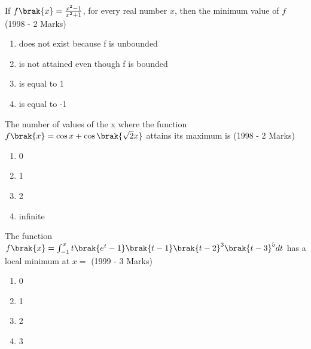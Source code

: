 \iffalse
  \title{Assignment}
  \author{Siddhanth Yellanki}
  \section{mcq-multiple}
\fi
    \item{
            If $f\brak{x} =  \frac{x^2-1}{x^2+1}$, for every real number $x$, then the minimum value of $f$  \\ \text{  }\hfill
                {(1998 - 2 Marks)}
            \begin{enumerate}
                \item does not exist because f is unbounded
                \item is not attained even though f is bounded
                \item is equal to 1
                \item is equal to -1
            \end{enumerate} 
            }
    \item{
            The number of values of the x where the function $f\brak{x}=\cos x + \cos\brak{\sqrt{2}x}$ attains its maximum is  \hfill
                {(1998 - 2 Marks)}
            \begin{multicols}{2}
                \begin{enumerate}
                    \item 0
                    \item 1
                    \item 2
                    \item infinite
                \end{enumerate}
            \end{multicols}
        }
    \item{
     
            The function $f\brak{x}= \int_{-1}^x t\brak{e^t-1}\brak{t-1}\brak{t-2}^3\brak{t-3}^5dt$ has a local minimum at $x=$  \hfill
                {(1999 - 3 Marks)}
            \begin{multicols}{2}
                \begin{enumerate}
                    \item 0 
                    \item 1
                    \item 2
                    \item 3
                \end{enumerate}
            \end{multicols}
        
        }
